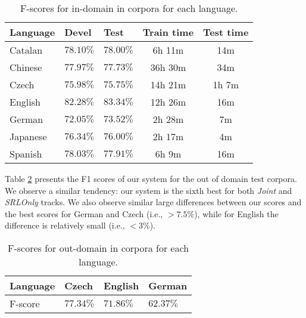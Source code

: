 \begin{table}
\begin{center}
\small
\begin{tabular}{|l|l|l|c|c|}\hline
Language           & Devel        & Test       & Train time  & Test time  
\\\hline\hline
Catalan         & $78.10\%$    & $78.00\%$  & 6h 11m  & 14m   \\ %
Chinese         & $77.97\%$    & $77.73\%$  & 36h 30m & 34m   \\ %
Czech           & $75.98\%$    & $75.75\%$  & 14h 21m & 1h 7m \\ %
English         & $82.28\%$    & $83.34\%$  & 12h 26m & 16m   \\ %
German          & $72.05\%$    & $73.52\%$  & 2h 28m  & 7m    \\ %
Japanese        & $76.34\%$    & $76.00\%$  & 2h 17m  & 4m    \\ %
Spanish         & $78.03\%$    & $77.91\%$  & 6h 9m   & 16m   \\ %

\hline
\end{tabular}
\caption{F-scores for in-domain in corpora for each language.}
\label{tbl:results}
\normalsize
\end{center}
\end{table}

Table \ref{tbl:outresults} presents the F1 scores of our system for the out of 
domain test corpora. We observe a similar tendency: our system is the sixth best 
for both \emph{Joint} and \emph{SRLOnly} tracks. We also observe similar 
large differences between our scores and the best scores for German and Czech 
(i.e., $>7.5\%$), while for English the difference is relatively small (i.e., $<3\%$). 

\begin{table}
\begin{center}
\small
\begin{tabular}{|l|l|l|l|}\hline
Language        & Czech & English & German\\\hline\hline
F-score           & $77.34\%$ & $71.86\%$ & $62.37\%$  \\
\hline
\end{tabular}
\caption{F-scores for out-domain in corpora for each language.}
\label{tbl:outresults}
\normalsize
\end{center}
\end{table}

